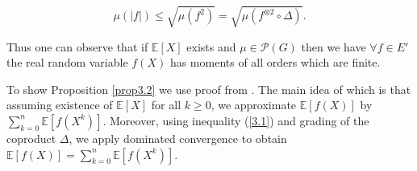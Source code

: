 \documentclass[12pt,a4paper]{report}
\theoremstyle{definition}
\begin{document}
\begin{equation} \label{3.1}
	\mu (\lvert f \rvert)\leq \sqrt{\mu (f^2)} =\sqrt{\mu(f^{\otimes 2}\circ\Delta)}.
\end{equation}

Thus one can observe that if $\mathbb{E}[X]$ exists and $\mu \in \mathcal{P}(G)$ then we have $\forall f\in E'$ the real random variable $f(X)$ has moments of all orders which are finite.


To show Proposition \ref{prop3.2} we use proof from \parencite[][Prop. 3.2]{chevyrev2016characteristic}. The main idea of which is that assuming existence of $\mathbb{E}[X]$ for all $k\geq 0$, we approximate $\mathbb{E}[f(X)]$ by $\sum_{k=0}^{n}\mathbb{E}[f(X^k)]$. Moreover, using inequality (\ref{3.1}) and  grading of the coproduct $\Delta$, we apply dominated convergence to obtain $\mathbb{E}[f(X)]=\sum_{k=0}^{n}\mathbb{E}[f(X^k)]$.
\end{document}
